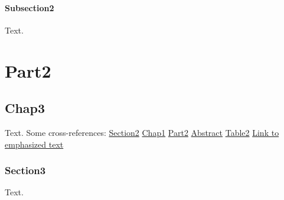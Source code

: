 \documentclass[a4paper,11pt]{book}
\begin{document}
\subsection{Subsection2}
\label{s:8}
Text.

\part{Part2}
\label{s:9}
\chapter{Chap3}
\label{s:10}
\setcounter{tocdepth}{3}
\minitoc
Text. Some cross-references:
\hyperref[s:7]{Section2}
\hyperref[s:3]{Chap1}
\hyperref[s:9]{Part2}
\hyperref[s:1]{Abstract}
\hyperref[tbl:2]{Table2}
\hyperlink{label1}{Link to emphasized text}

\section{Section3}
\label{s:11}
Text.

\setcounter{tocdepth}{3}
\listoftables
\end{document}

